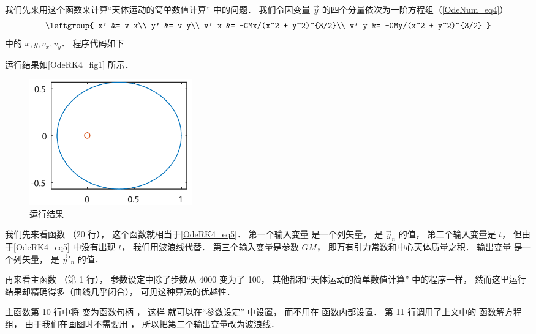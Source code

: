 我们先来用这个函数来计算“天体运动的简单数值计算” 中的问题． 我们令因变量 $\vec y$ 的四个分量依次为一阶方程组（\autoref{OdeNum_eq4}）
\begin{equation}\label{OdeRK4_eq5}
\leftgroup{
x' &= v_x\\
y' &= v_y\\
v'_x &= -GMx/(x^2 + y^2)^{3/2}\\
v'_y &= -GMy/(x^2 + y^2)^{3/2}
}\end{equation}
中的 $x, y, v_x, v_y$． 程序代码如下


运行结果如\autoref{OdeRK4_fig1} 所示．

\begin{figure}[ht]
\centering
\includegraphics[width=7cm]{./figures/OdeRK41.pdf}
\caption{运行结果} \label{OdeRK4_fig1}
\end{figure}

我们先来看函数  （20 行）， 这个函数就相当于\autoref{OdeRK4_eq5}． 第一个输入变量  是一个列矢量， 是 $\vec y_n$ 的值， 第二个输入变量是 $t$， 但由于\autoref{OdeRK4_eq5} 中没有出现 $t$， 我们用波浪线代替． 第三个输入变量是参数 $GM$， 即万有引力常数和中心天体质量之积． 输出变量  是一个列矢量， 是 $\vec y'_n$ 的值．

再来看主函数  （第 1 行）， 参数设定中除了步数从 4000 变为了 100， 其他都和“天体运动的简单数值计算” 中的程序一样， 然而这里运行结果却精确得多（曲线几乎闭合）， 可见这种算法的优越性．

主函数第 10 行中将  变为函数句柄 ， 这样  就可以在“参数设定” 中设置， 而不用在  函数内部设置． 第 11 行调用了上文中的  函数解方程组， 由于我们在画图时不需要用 ， 所以把第二个输出变量改为波浪线．
